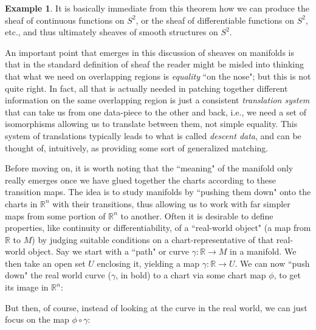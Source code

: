 \documentclass[a4paper]{book}
\theoremstyle{definition}
\newtheorem{example}{Example}[section]
\theoremstyle{definition}
\theoremstyle{definition}
\theoremstyle{theorem}
\theoremstyle{definition}
\begin{document}
\begin{example}
		It is basically immediate from this theorem how we can produce the sheaf of continuous functions on $S^2$, or the sheaf of differentiable functions on $S^2$, etc., and thus ultimately sheaves of smooth structures on $S^2$. \par
	An important point that emerges in this discussion of sheaves on manifolds is that in the standard definition of sheaf the reader might be misled into thinking that what we need on overlapping regions is \textit{equality} ``on the nose"; but this is not quite right. In fact, all that is actually needed in patching together different information on the same overlapping region is just a consistent \textit{translation system} that can take us from one data-piece to the other and back, i.e., we need a set of isomorphisms allowing us to translate between them, not simple equality. This system of translations typically leads to what is called \textit{descent data}, and can be thought of, intuitively, as providing some sort of generalized matching. \par     
	Before moving on, it is worth noting that the ``meaning" of the manifold only really emerges once we have glued together the charts according to these transition maps. The idea is to study manifolds by ``pushing them down" onto the charts in $\mathbb{R}^n$ with their transitions, thus allowing us to work with far simpler maps from some portion of $\mathbb{R}^n$ to another. Often it is desirable to define properties, like continuity or differentiability, of a ``real-world object" (a map from $\mathbb{R}$ to $M$) by judging suitable conditions on a chart-representative of that real-world object. Say we start with a ``path" or curve $\gamma: \mathbb{R} \rightarrow M$ in a manifold. We then take an open set $U$ enclosing it, yielding a map $\gamma: \mathbb{R} \rightarrow U$. We can now ``push down" the real world curve ($\gamma$, in bold) to a chart via some chart map $\phi$, to get its image in $\mathbb{R}^n$: 
	\begin{center}  
	\end{center}  
	But then, of course, instead of looking at the curve in the real world, we can just focus on the map $\phi \circ \gamma$: 
	\begin{center}  
		\begin{tikzcd}

\end{tikzcd}
\end{center}
\end{example}
\end{document}

